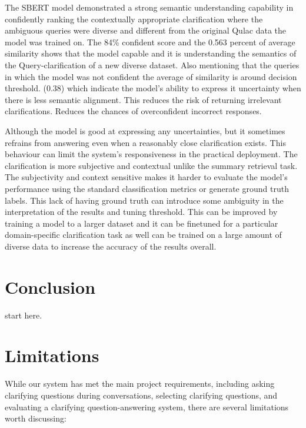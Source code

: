 \documentclass[11pt]{article}
\begin{document}
The SBERT model demonstrated a strong semantic understanding capability in confidently ranking the contextually appropriate clarification where the ambiguous queries were diverse and different from the original Qulac data the model was trained on. The 84\% confident score and the 0.563 percent of average similarity shows that the model capable and it is understanding the semantics of the Query-clarification of a new diverse dataset. Also mentioning that the queries in which the model was not confident the average of similarity is around decision threshold. (0.38) which indicate the model's ability to express it uncertainty when there is less semantic alignment. This reduces the risk of returning irrelevant clarifications.  Reduces the chances of overconfident incorrect responses.

Although the model is good at expressing any uncertainties, but it sometimes refrains from answering even when a reasonably close clarification exists.  This behaviour can limit the system's responsiveness in the practical deployment.
The clarification is more subjective and contextual unlike the summary retrieval task. The subjectivity and context sensitive makes it harder to evaluate the model's performance using the standard classification metrics or generate ground truth labels. This lack of having ground truth can introduce some ambiguity in the interpretation of the results and tuning threshold.  This can be improved by training a model to a larger dataset and it can be finetuned for a particular domain-specific clarification task as well can be trained on a large amount of diverse data to increase the accuracy of the results overall.


\section{Conclusion}
start here.

\section*{Limitations}

While our system has met the main project requirements, including asking clarifying questions during conversations, selecting clarifying questions, and evaluating a clarifying question-answering system, there are several limitations worth discussing:
\end{document}
